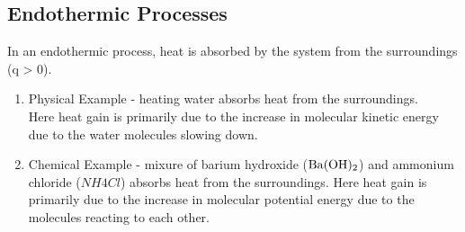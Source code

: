 \documentclass[../CHEM152Notes.tex]{subfiles}
\begin{document}
\subsection*{Endothermic Processes}
In an endothermic process, heat is absorbed by the system from the surroundings (q > 0).
\begin{enumerate}
    \item Physical Example - heating water absorbs heat from the surroundings. \\
    Here heat gain is primarily due to the increase in molecular kinetic energy due to the water molecules slowing down.
    \item Chemical Example - mixure of barium hydroxide ($\ce{Ba(OH)2}$) and ammonium chloride ($NH4Cl$) absorbs heat from the surroundings.
    Here heat gain is primarily due to the increase in molecular potential energy due to the molecules reacting to each other.
\end{enumerate}
\end{document}
